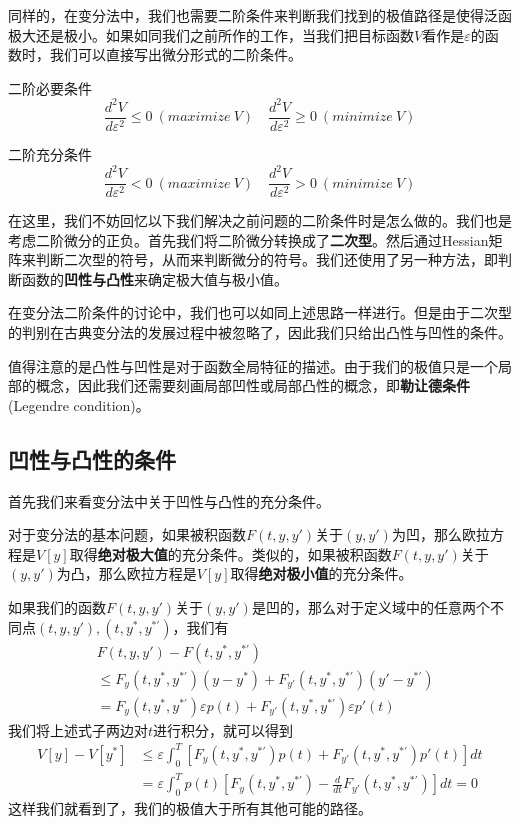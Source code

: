 \documentclass[UTF8,12pt]{ctexart}
\numberwithin{equation}{section} %
\numberwithin{figure}{section}
\numberwithin{table}{section}
\begin{document}
	同样的，在变分法中，我们也需要二阶条件来判断我们找到的极值路径是使得泛函极大还是极小。如果如同我们之前所作的工作，当我们把目标函数$V$看作是$\varepsilon$的函数时，我们可以直接写出微分形式的二阶条件。
	
	二阶必要条件
	\begin{equation}
		\frac{d^2V}{d\varepsilon^2} \leqslant 0 \ (maximize \ V) \quad \frac{d^2V}{d\varepsilon^2} \geqslant 0 \ (minimize \ V)
	\end{equation}
	
	二阶充分条件
	\begin{equation}
		\frac{d^2V}{d\varepsilon^2} < 0 \ (maximize \ V) \quad \frac{d^2V}{d\varepsilon^2} > 0 \ (minimize \ V)
	\end{equation}

	在这里，我们不妨回忆以下我们解决之前问题的二阶条件时是怎么做的。我们也是考虑二阶微分的正负。首先我们将二阶微分转换成了\textbf{二次型}。然后通过Hessian矩阵来判断二次型的符号，从而来判断微分的符号。我们还使用了另一种方法，即判断函数的\textbf{凹性与凸性}来确定极大值与极小值。
	
	在变分法二阶条件的讨论中，我们也可以如同上述思路一样进行。但是由于二次型的判别在古典变分法的发展过程中被忽略了，因此我们只给出凸性与凹性的条件。
	
	值得注意的是凸性与凹性是对于函数全局特征的描述。由于我们的极值只是一个局部的概念，因此我们还需要刻画局部凹性或局部凸性的概念，即\textbf{勒让德条件}(Legendre condition)。
	
	\subsection{凹性与凸性的条件}
	首先我们来看变分法中关于凹性与凸性的充分条件。
	
	对于变分法的基本问题，如果被积函数$F(t,y,y')$关于$(y,y')$为凹，那么欧拉方程是$V[y]$取得\textbf{绝对极大值}的充分条件。类似的，如果被积函数$F(t,y,y')$关于$(y,y')$为凸，那么欧拉方程是$V[y]$取得\textbf{绝对极小值}的充分条件。
	
	如果我们的函数$F(t,y,y')$关于$(y,y')$是凹的，那么对于定义域中的任意两个不同点$(t,y,y'),(t,y^*,y^{*'})$，我们有
	\begin{equation}
		\begin{aligned}
			&F(t,y,y') - F(t,y^*,y^{*'}) \\
			& \leqslant  F_y(t,y^*,y^{*'})(y - y^*) +  F_{y'}(t,y^*,y^{*'})(y' - y^{*'}) \\
			&=F_y(t,y^*,y^{*'})\varepsilon p(t) +  F_{y'}(t,y^*,y^{*'})\varepsilon p'(t)
		\end{aligned}
	\end{equation}
	我们将上述式子两边对$t$进行积分，就可以得到
	\begin{equation}
		\begin{aligned}
			V[y] - V[y^*] 
			&\leqslant \varepsilon \int_{0}^{T} [F_y(t,y^*,y^{*'}) p(t) +  F_{y'}(t,y^*,y^{*'}) p'(t)]dt \\
			&=\varepsilon \int_{0}^{T} p(t)[F_y(t,y^*,y^{*'}) - \frac{d}{dt}F_{y'}(t,y^*,y^{*'})]dt = 0
		\end{aligned}
	\end{equation}
	这样我们就看到了，我们的极值大于所有其他可能的路径。
	
\end{document}
